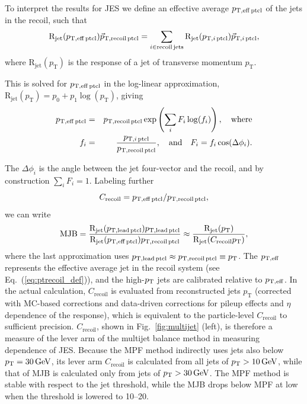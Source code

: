 \documentclass[11pt,twoside,a4paper,cmspaper,final,collab]{cms-tdr}
\begin{document}
To interpret the results for JES we define an effective average $p_{\mathrm{T},\rm eff\, ptcl}$ of the jets in the recoil, such that
\begin{equation}
\mathrm{R}_\text{jet}(p_{\mathrm{T},\rm eff \, ptcl})\vec{p}_{\mathrm{T},\rm recoil\, ptcl} = \sum_{i\in\mathrm{recoil\, jets}} \mathrm{R}_\text{jet}(p_{\mathrm{T},i\,\mathrm{ ptcl}})\vec{p}_{\mathrm{T},i\,\mathrm{ptcl}},
\label{eq:ptrecoil_def}
\end{equation}
where $\mathrm{R}_\text{jet}(p_\mathrm{T})$ is the response of a jet of transverse momentum $p_\mathrm{T}$.

This is solved for $p_{\mathrm{T},\rm eff\, ptcl}$ in the log-linear approximation, $\mathrm{R}_\text{jet}(p_\mathrm{T}) = p_0 + p_1\log(p_{\mathrm{T}})$, giving
\begin{eqnarray}
p_{\mathrm{T},\rm eff\, ptcl} &=& p_{\mathrm{T},\rm recoil\, ptcl}\exp\left(\sum_iF_i\log(f_i)\right),\quad\mathrm{where}\\
f_i &=& \frac{p_{\mathrm{T},i\, \mathrm{ptcl}}}{p_{\mathrm{T},\rm recoil\, ptcl}},\quad\mathrm{and}\quad
F_i = f_i\cos(\Delta\phi_i).
\end{eqnarray}

The $\Delta\phi_i$ is the angle between the jet four-vector and the recoil, and by construction $\sum_i F_i=1$. Labeling further
\begin{equation}\label{eq:crecoil}
C_\mathrm{recoil} = p_{\mathrm{T},\rm eff\, ptcl}/p_{\mathrm{T},\rm recoil\, ptcl},
\end{equation}
we can write
\begin{equation}\label{eq:mjb}
\mathrm{MJB} = \frac{\mathrm{R}_\text{jet}(p_{\mathrm{T},\rm lead\, ptcl})p_{\mathrm{T},\rm lead\, ptcl}}{\mathrm{R}_\text{jet}(p_{\mathrm{T},\rm eff\, ptcl})p_{\mathrm{T},\rm recoil\, ptcl}} \approx \frac{\mathrm{R}_\text{jet}(p_{\mathrm{T}})}{\mathrm{R}_\text{jet}(C_\mathrm{recoil} p_{\mathrm{T}})},
\end{equation}
where the last approximation uses $p_{\mathrm{T},\rm lead\, ptcl}\approx p_{\mathrm{T},\rm recoil\, ptcl} \equiv p_{\mathrm{T}}$. The $p_{\mathrm{T},\rm eff}$ represents the effective average jet \pt in the recoil system (see Eq.~(\ref{eq:ptrecoil_def})),
and the high-$p_{\mathrm{T}}$ jets are calibrated relative to $p_{\mathrm{T},\rm eff}$.
In the actual calculation, $C_\mathrm{recoil}$ is evaluated from reconstructed jets $p_{\mathrm{T}}$ (corrected with MC-based corrections and data-driven corrections for pileup effects and $\eta$ dependence of the response), which is equivalent to the particle-level $C_\mathrm{recoil}$ to sufficient precision. $C_\mathrm{recoil}$, shown in Fig.~\ref{fig:multijet} (left), is therefore a measure of
the lever arm of the multijet balance method
in measuring \pt dependence of JES. Because the MPF method indirectly uses jets also below $p_{\mathrm{T}}=30\,\text{Ge\hspace{-.08em}V}$, its lever arm $C_\mathrm{recoil}$ is calculated from all jets of $p_{\mathrm{T}}>10\,\text{Ge\hspace{-.08em}V}$, while that of MJB is calculated only from jets of $p_{\mathrm{T}}>30\,\text{Ge\hspace{-.08em}V}$.
The MPF method is stable with respect to the jet \pt threshold, while the MJB drops below MPF at low \pt when the \pt threshold is lowered to 10--20\GeV.
\end{document}
